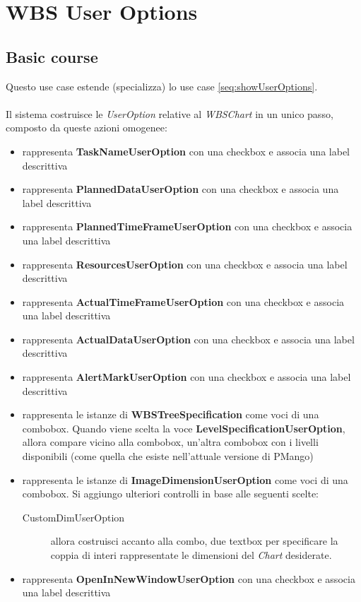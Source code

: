 \section{WBS User Options}
\label{seq:wbsUserOption}
\subsection{Basic course}
Questo use case estende (specializza) lo use case \ref{seq:showUserOptions}.
\\ \\
Il sistema costruisce le \emph{UserOption} relative al \emph{WBSChart} in un
unico passo, composto da queste azioni omogenee:
\begin{itemize}
  \item rappresenta \textbf{TaskNameUserOption} con una checkbox e associa una
  label descrittiva
  \item rappresenta \textbf{PlannedDataUserOption} con una checkbox e associa una
  label descrittiva
  \item rappresenta \textbf{PlannedTimeFrameUserOption} con una checkbox e associa una
  label descrittiva
  \item rappresenta \textbf{ResourcesUserOption} con una checkbox e associa una
  label descrittiva
  \item rappresenta \textbf{ActualTimeFrameUserOption} con una checkbox e associa una
  label descrittiva
  \item rappresenta \textbf{ActualDataUserOption} con una checkbox e associa una
  label descrittiva
  \item rappresenta \textbf{AlertMarkUserOption} con una checkbox e associa una
  label descrittiva
  \item rappresenta le istanze di \textbf{WBSTreeSpecification} come voci di una
  combobox. Quando viene scelta la voce \textbf{LevelSpecificationUserOption}, allora
  compare vicino alla combobox, un'altra combobox con i livelli disponibili
  (come quella che esiste nell'attuale versione di PMango)
  \item rappresenta le istanze di \textbf{ImageDimensionUserOption} come voci di
  una combobox. Si aggiungo ulteriori controlli in base alle seguenti scelte:
  \begin{description}
    \item[CustomDimUserOption] allora costruisci accanto alla combo, due
    textbox per specificare la coppia di interi rappresentate le dimensioni del
    \emph{Chart} desiderate.
  \end{description}
  \item rappresenta \textbf{OpenInNewWindowUserOption} con una checkbox e associa una
  label descrittiva
\end{itemize}